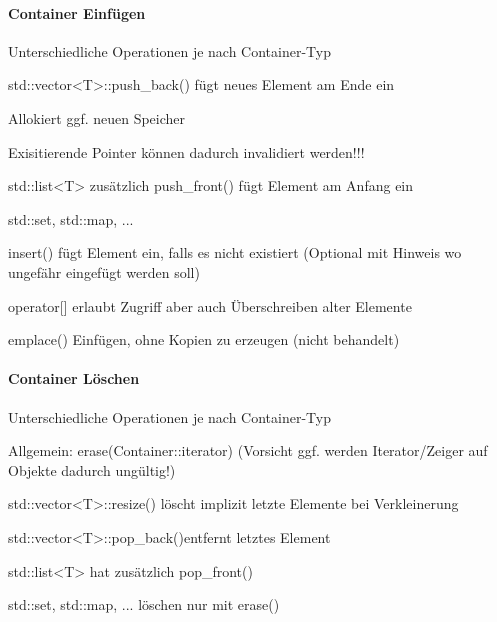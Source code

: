 \documentclass[10pt]{article}
\begin{document}
\paragraph{Container Einfügen}
\begin{itemize*}
  \item Unterschiedliche Operationen je nach Container-Typ
  \item std::vector<T>::push\_back() fügt neues Element am Ende ein
  \begin{itemize*}
    \item Allokiert ggf. neuen Speicher
    \item Exisitierende Pointer können dadurch invalidiert werden!!!
  \end{itemize*}
  \item std::list<T> zusätzlich push\_front() fügt Element am Anfang ein
  \item std::set, std::map, ...
  \begin{itemize*}
    \item insert() fügt Element ein, falls es nicht existiert (Optional mit Hinweis wo ungefähr eingefügt werden soll)
    \item operator[] erlaubt Zugriff aber auch Überschreiben alter Elemente
    \item emplace() Einfügen, ohne Kopien zu erzeugen (nicht behandelt)
  \end{itemize*}
\end{itemize*}

\paragraph{Container Löschen}
\begin{itemize*}
  \item Unterschiedliche Operationen je nach Container-Typ
  \item Allgemein: erase(Container::iterator) (Vorsicht ggf. werden Iterator/Zeiger auf Objekte dadurch ungültig!)
  \item std::vector<T>::resize() löscht implizit letzte Elemente bei Verkleinerung
  \item std::vector<T>::pop\_back()entfernt letztes Element
  \item std::list<T> hat zusätzlich pop\_front()
  \item std::set, std::map, ... löschen nur mit erase()
\end{itemize*}
\end{document}
